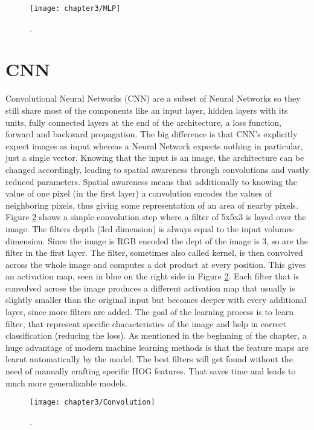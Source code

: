 \begin{figure}[H]
  \centering
  \caption{. \cite{cs231nconvolution}}
  \texttt{[image: chapter3/MLP]}
  \label{fig:MLP}
\end{figure}

\section{CNN}

Convolutional Neural Networks (CNN) are a subset of Neural Networks so they still share most of the components like an input layer, hidden layers with its units, fully connected layers at the end of the architecture, a loss function, forward and backward propagation. The big difference is that CNN's explicitly expect images as input whereas a Neural Network expects nothing in particular, just a single vector. Knowing that the input is an image, the architecture can be changed accordingly, leading to spatial awareness through convolutions and vastly reduced parameters. Spatial awareness means that additionally to knowing the value of one pixel (in the first layer) a convolution encodes the values of neighboring pixels, thus giving some representation of an area of nearby pixels. Figure \ref{fig:Convolution} shows a simple convolution step where a filter of 5x5x3 is layed over the image. The filters depth (3rd dimension) is always equal to the input volumes dimension. Since the image is RGB encoded the dept of the image is 3, so are the filter in the first layer. The filter, sometimes also called kernel, is then convolved across the whole image and computes a dot product at every position. This gives an activation map, seen in blue on the right side in Figure \ref{fig:Convolution}. Each filter that is convolved across the image produces a different activation map that usually is slightly smaller than the original input but becomes deeper with every additional layer, since more filters are added. The goal of the learning process is to learn filter, that represent specific characteristics of the image and help in correct classification (reducing the loss). As mentioned in the beginning of the chapter, a huge advantage of modern machine learning methods is that the feature maps are learnt automatically by the model. The best filters will get found without the need of manually crafting specific HOG features. That saves time and leads to much more generalizable models.

\begin{figure}[H]
  \centering
  \caption{. \cite{cs231nconvolution}}
  \texttt{[image: chapter3/Convolution]}
  \label{fig:Convolution}
\end{figure}

